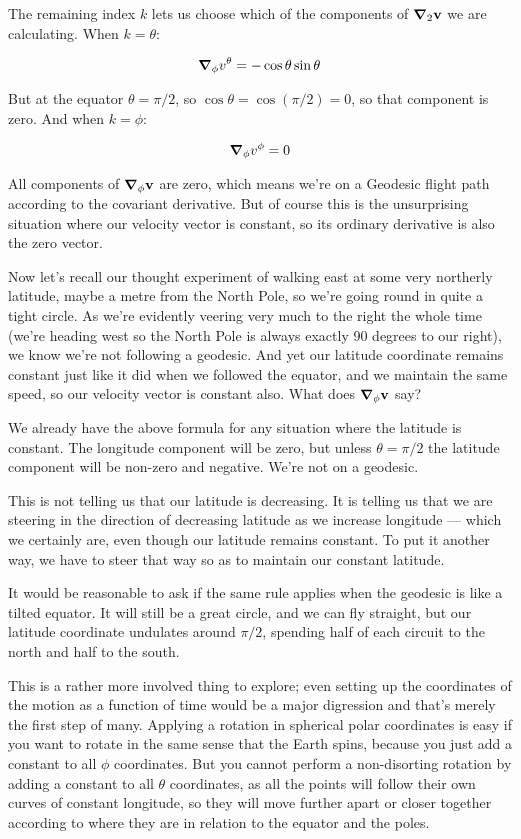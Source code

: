 The remaining index $k$ lets us choose which of the components of $\grad_2 \mathbf{v}$ we are calculating. When $k=\theta$:

$$
\grad_{\phi} v^{\theta}
= -\cos\theta\sin\theta
$$

But at the equator $\theta = \pi/2$, so $\cos\theta = \cos(\pi/2) = 0$, so that component is zero. And when $k=\phi$:

$$
\grad_{\phi} v^{\phi} = 0
$$

All components of $\grad_{\phi} \mathbf{v}$ are zero, which means we're on a Geodesic flight path according to the covariant derivative. But of course this is the unsurprising situation where our velocity vector is constant, so its ordinary derivative is also the zero vector.

Now let's recall our thought experiment of walking east at some very northerly latitude, maybe a metre from the North Pole, so we're going round in quite a tight circle. As we're evidently veering very much to the right the whole time (we're heading west so the North Pole is always exactly 90 degrees to our right), we know we're not following a geodesic. And yet our latitude coordinate remains constant just like it did when we followed the equator, and we maintain the same speed, so our velocity vector is constant also. What does $\grad_\phi \mathbf{v}$ say?

We already have the above formula for any situation where the latitude is constant. The longitude component will be zero, but unless $\theta = \pi/2$ the latitude component will be non-zero and negative. We're not on a geodesic.

This is not telling us that our latitude is decreasing. It is telling us that we are steering in the direction of decreasing latitude as we increase longitude --- which we certainly are, even though our latitude remains constant. To put it another way, we have to steer that way so as to maintain our constant latitude.

It would be reasonable to ask if the same rule applies when the geodesic is like a tilted equator. It will still be a great circle, and we can fly straight, but our latitude coordinate undulates around $\pi/2$, spending half of each circuit to the north and half to the south.

This is a rather more involved thing to explore; even setting up the coordinates of the motion as a function of time would be a major digression and that's merely the first step of many. Applying a rotation in spherical polar coordinates is easy if you want to rotate in the same sense that the Earth spins, because you just add a constant to all $\phi$ coordinates. But you cannot perform a non-disorting rotation by adding a constant to all $\theta$ coordinates, as all the points will follow their own curves of constant longitude, so they will move further apart or closer together according to where they are in relation to the equator and the poles.

